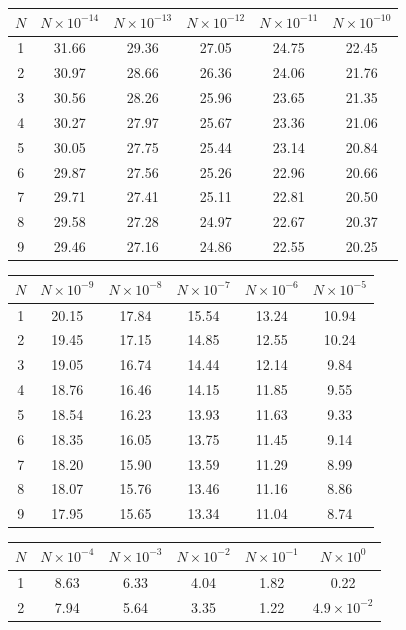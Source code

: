 \begin{table}[H]
\centering\footnotesize
\begin{tabular}{c|ccccc}
\toprule
$N$ & $N\times10^{-14}$ & $N\times10^{-13}$ & $N\times10^{-12}$ & $N\times10^{-11}$ & $N\times10^{-10}$\\
\midrule
1 & 31.66 & 29.36 & 27.05 & 24.75 & 22.45\\
2 & 30.97 & 28.66 & 26.36 & 24.06 & 21.76\\
3 & 30.56 & 28.26 & 25.96 & 23.65 & 21.35\\
4 & 30.27 & 27.97 & 25.67 & 23.36 & 21.06\\
5 & 30.05 & 27.75 & 25.44 & 23.14 & 20.84\\
6 & 29.87 & 27.56 & 25.26 & 22.96 & 20.66\\
7 & 29.71 & 27.41 & 25.11 & 22.81 & 20.50\\
8 & 29.58 & 27.28 & 24.97 & 22.67 & 20.37\\
9 & 29.46 & 27.16 & 24.86 & 22.55 & 20.25\\
\bottomrule
\end{tabular}\par\medskip
\begin{tabular}{c|ccccc}
\toprule
$N$ & $N\times10^{-9}$ & $N\times10^{-8}$ & $N\times10^{-7}$ & $N\times10^{-6}$ & $N\times10^{-5}$\\
\midrule
1 & 20.15 & 17.84 & 15.54 & 13.24 & 10.94\\
2 & 19.45 & 17.15 & 14.85 & 12.55 & 10.24\\
3 & 19.05 & 16.74 & 14.44 & 12.14 & 9.84\\
4 & 18.76 & 16.46 & 14.15 & 11.85 & 9.55\\
5 & 18.54 & 16.23 & 13.93 & 11.63 & 9.33\\
6 & 18.35 & 16.05 & 13.75 & 11.45 & 9.14\\
7 & 18.20 & 15.90 & 13.59 & 11.29 & 8.99\\
8 & 18.07 & 15.76 & 13.46 & 11.16 & 8.86\\
9 & 17.95 & 15.65 & 13.34 & 11.04 & 8.74\\
\bottomrule
\end{tabular}\par\medskip
\begin{tabular}{c|ccccc}
\toprule
$N$ & $N\times10^{-4}$ & $N\times10^{-3}$ & $N\times10^{-2}$ & $N\times10^{-1}$ & $N\times10^{0}$\\
\midrule
1 & 8.63 & 6.33 & 4.04 & 1.82 & 0.22\\
2 & 7.94 & 5.64 & 3.35 & 1.22 & $4.9\times10^{-2}$\\

\end{tabular}
\end{table}

